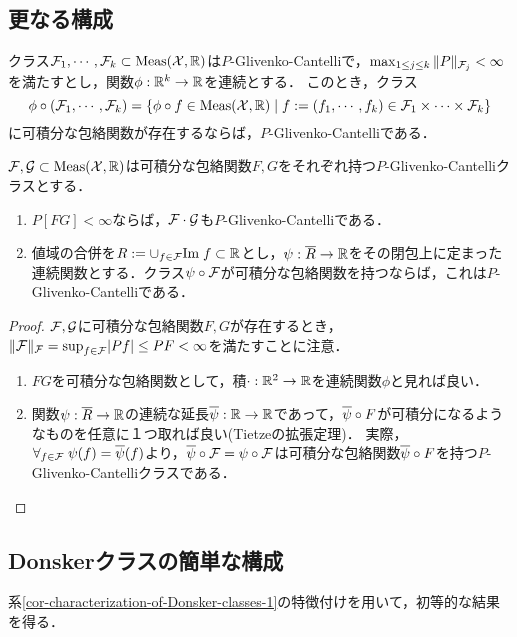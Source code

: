 \documentclass[uplatex,dvipdfmx]{jsreport}
\begin{document}
\subsection{更なる構成}

\begin{theorem}
    クラス$\mathcal{F}_1,\cdots,\mathcal{F}_k\subset\mathrm{Meas}(\mathcal{X},\mathbb{R})$は$P$-Glivenko-Cantelliで，$\max_{1\le j\le k}\|P\|_{\mathcal{F}_j}<\infty$を満たすとし，関数$\phi:\mathbb{R}^k\to\mathbb{R}$を連続とする．
    このとき，クラス
    \[\phi\circ(\mathcal{F}_1,\cdots,\mathcal{F}_k)=\left\{\phi\circ f\in\mathrm{Meas}(\mathcal{X},\mathbb{R})\mid f:=(f_1,\cdots,f_k)\in\mathcal{F}_1\times\cdots\times\mathcal{F}_k\right\}\]
    に可積分な包絡関数が存在するならば，$P$-Glivenko-Cantelliである．
\end{theorem}

\begin{corollary}
    $\mathcal{F},\mathcal{G}\subset\mathrm{Meas}(\mathcal{X},\mathbb{R})$は可積分な包絡関数$F,G$をそれぞれ持つ$P$-Glivenko-Cantelliクラスとする．
    \begin{enumerate}
        \item $P[FG]<\infty$ならば，$\mathcal{F}\cdot\mathcal{G}$も$P$-Glivenko-Cantelliである．
        \item 値域の合併を$R:=\cup_{f\in\mathcal{F}}\mathrm{Im}\; f\subset\mathbb{R}$とし，$\psi:\overline{R}\to\mathbb{R}$をその閉包上に定まった連続関数とする．クラス$\psi\circ\mathcal{F}$が可積分な包絡関数を持つならば，これは$P$-Glivenko-Cantelliである．
    \end{enumerate}
\end{corollary}
\begin{proof}
    $\mathcal{F},\mathcal{G}$に可積分な包絡関数$F,G$が存在するとき，$\|\mathcal{F}\|_{\mathcal{F}}=\sup_{f\in\mathcal{F}}\lvert Pf\rvert\le PF<\infty$を満たすことに注意．
    \begin{enumerate}
        \item $FG$を可積分な包絡関数として，積$\cdot:\mathbb{R}^2\to\mathbb{R}$を連続関数$\phi$と見れば良い．
        \item 関数$\psi:\overline{R}\to\mathbb{R}$の連続な延長$\overline{\psi}:\mathbb{R}\to\mathbb{R}$であって，$\overline{\psi}\circ F$が可積分になるようなものを任意に１つ取れば良い(Tietzeの拡張定理)．
        実際，$\forall_{f\in\mathcal{F}}\;\psi(f)=\overline{\psi}(f)$より，$\overline{\psi}\circ\mathcal{F}=\psi\circ\mathcal{F}$は可積分な包絡関数$\overline{\psi}\circ F$を持つ$P$-Glivenko-Cantelliクラスである．
    \end{enumerate}
\end{proof}

\subsection{Donskerクラスの簡単な構成}

\begin{tcolorbox}[colframe=ForestGreen, colback=ForestGreen!10!white,breakable,colbacktitle=ForestGreen!40!white,coltitle=black,fonttitle=\bfseries\sffamily,
title=]
    系\ref{cor-characterization-of-Donsker-classes-1}の特徴付けを用いて，初等的な結果を得る．
\end{tcolorbox}
\end{document}
